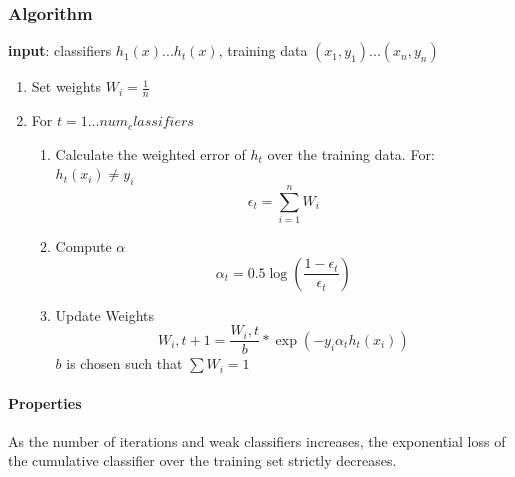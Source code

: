 \documentclass[10pt,twocolumn,letterpaper]{article}
\begin{document}
\subsubsection{Algorithm \cite{adalecture}}
\textbf{input}: classifiers $h_1(x)...h_t(x)$, training data ${(x_1,y_1)...(x_n,y_n)}$ 
\begin{enumerate}
\item Set weights $W_i = \frac{1}{n}$
\item For $t=1...num_classifiers$
\begin{enumerate}
\item Calculate the weighted error of $h_t$ over the training data. For:
$ h_t(x_i)\ne y_i$
\begin{equation}
\epsilon_t = \sum_{i=1}^{n}W_i 
\end{equation}
\item Compute $\alpha$
\begin{equation}
\alpha_t = 0.5\log\left(\frac{1-\epsilon_t}{\epsilon_t}\right)
\end{equation}
\item Update Weights 
\begin{equation}
W_i,t+1=\frac{W_i,t}{b}*\exp(-y_i\alpha_th_t(x_i))
\end{equation}
$b$ is chosen such that $\sum W_i = 1$
\end{enumerate}
\end{enumerate}
\paragraph{Properties} As the number of iterations and weak classifiers increases, the exponential loss of the cumulative classifier over the training set strictly decreases.
\end{document}
